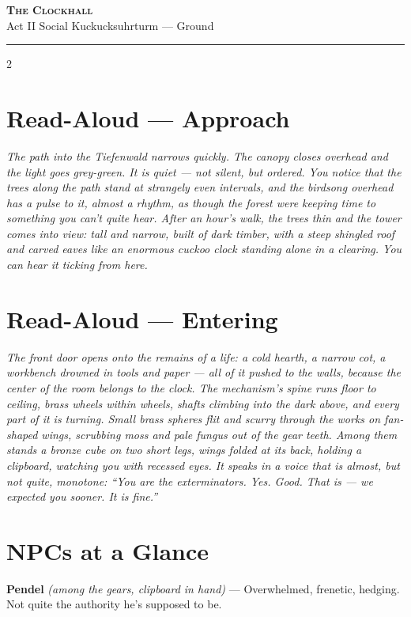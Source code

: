 \documentclass[10pt,letterpaper]{article}
\newcommand{\sceneheader}[4]{%
  \fancyhead[L]{\small\textcolor{accent}{\scshape #1}}%
  \fancyhead[R]{\small\textcolor{accent}{#2 \quad \textbullet \quad #3}}%
  \begin{center}
  {\LARGE\bfseries\scshape\textcolor{accent}{#1}}\\[2pt]
  {\small #2 \quad \textbullet \quad #3 \quad \textbullet \quad #4}\\[2pt]
  \textcolor{rulecol}{\rule{0.5\textwidth}{0.8pt}}
  \end{center}
  \vspace{-4pt}
}
\newcommand{\npc}[3]{\textbf{#1} \textit{(#2)} --- #3}
\begin{document}
\label{sec:clockhall}\sceneheader{The Clockhall}{Act II}{Social}{Kuckucksuhrturm --- Ground}

\begin{multicols}{2}

\section*{Read-Aloud --- Approach}
\begin{readaloud}
\itshape
The path into the Tiefenwald narrows quickly. The canopy closes overhead and the light goes grey-green. It is quiet --- not silent, but ordered. You notice that the trees along the path stand at strangely even intervals, and the birdsong overhead has a pulse to it, almost a rhythm, as though the forest were keeping time to something you can't quite hear. After an hour's walk, the trees thin and the tower comes into view: tall and narrow, built of dark timber, with a steep shingled roof and carved eaves like an enormous cuckoo clock standing alone in a clearing. You can hear it ticking from here.
\end{readaloud}

\section*{Read-Aloud --- Entering}
\begin{readaloud}
\itshape
The front door opens onto the remains of a life: a cold hearth, a narrow cot, a workbench drowned in tools and paper --- all of it pushed to the walls, because the center of the room belongs to the clock. The mechanism's spine runs floor to ceiling, brass wheels within wheels, shafts climbing into the dark above, and every part of it is turning. Small brass spheres flit and scurry through the works on fan-shaped wings, scrubbing moss and pale fungus out of the gear teeth. Among them stands a bronze cube on two short legs, wings folded at its back, holding a clipboard, watching you with recessed eyes. It speaks in a voice that is almost, but not quite, monotone: ``You are the exterminators. Yes. Good. That is --- we expected you sooner. It is fine.''
\end{readaloud}

\section*{NPCs at a Glance}

\npc{Pendel}{among the gears, clipboard in hand}{Overwhelmed, frenetic, hedging. Not quite the authority he's supposed to be.}


\end{multicols}
\end{document}
